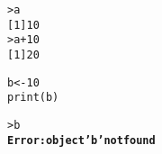 \documentclass{article}
\begin{document}
%


%
\begin{alltt}
> a 
[1] 10
> a + 10 
[1] 20

\end{alltt}


%
\begin{alltt}
b <- 10
print(b)
\end{alltt}


%
\begin{alltt}
> b 
{\bf Error: object 'b' not found}

\end{alltt}

\end{document}
